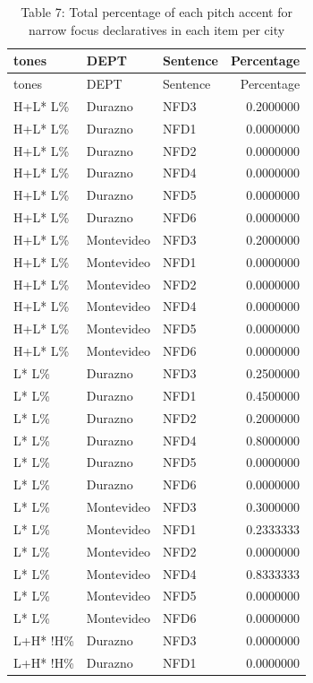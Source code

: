 \documentclass[
  man]{apa6}
\begin{document}
\begin{longtable}[]{@{}lllr@{}}
\caption{\label{tab:unnamed-chunk-15}Table 7: Total percentage of each pitch accent for narrow focus declaratives in each item per city}\tabularnewline
\toprule\noalign{}
tones & DEPT & Sentence & Percentage \\
\midrule\noalign{}
\endfirsthead
\toprule\noalign{}
tones & DEPT & Sentence & Percentage \\
\midrule\noalign{}
\endhead
\bottomrule\noalign{}
\endlastfoot
H+L* L\% & Durazno & NFD3 & 0.2000000 \\
H+L* L\% & Durazno & NFD1 & 0.0000000 \\
H+L* L\% & Durazno & NFD2 & 0.0000000 \\
H+L* L\% & Durazno & NFD4 & 0.0000000 \\
H+L* L\% & Durazno & NFD5 & 0.0000000 \\
H+L* L\% & Durazno & NFD6 & 0.0000000 \\
H+L* L\% & Montevideo & NFD3 & 0.2000000 \\
H+L* L\% & Montevideo & NFD1 & 0.0000000 \\
H+L* L\% & Montevideo & NFD2 & 0.0000000 \\
H+L* L\% & Montevideo & NFD4 & 0.0000000 \\
H+L* L\% & Montevideo & NFD5 & 0.0000000 \\
H+L* L\% & Montevideo & NFD6 & 0.0000000 \\
L* L\% & Durazno & NFD3 & 0.2500000 \\
L* L\% & Durazno & NFD1 & 0.4500000 \\
L* L\% & Durazno & NFD2 & 0.2000000 \\
L* L\% & Durazno & NFD4 & 0.8000000 \\
L* L\% & Durazno & NFD5 & 0.0000000 \\
L* L\% & Durazno & NFD6 & 0.0000000 \\
L* L\% & Montevideo & NFD3 & 0.3000000 \\
L* L\% & Montevideo & NFD1 & 0.2333333 \\
L* L\% & Montevideo & NFD2 & 0.0000000 \\
L* L\% & Montevideo & NFD4 & 0.8333333 \\
L* L\% & Montevideo & NFD5 & 0.0000000 \\
L* L\% & Montevideo & NFD6 & 0.0000000 \\
L+H* !H\% & Durazno & NFD3 & 0.0000000 \\
L+H* !H\% & Durazno & NFD1 & 0.0000000 \\

\end{longtable}
\end{document}
